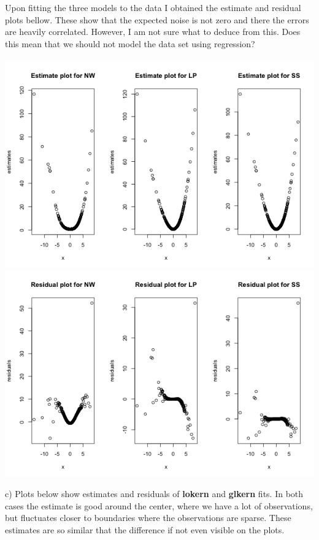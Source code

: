 \documentclass[a4paper,12pt]{article}
\begin{document}
Upon fitting the three models to the data I obtained the estimate and residual plots bellow. These show that the expected noise is not zero and there the errors are heavily correlated. However, I am not sure what to deduce from this. Does this mean that we should not model the data set using regression?
\\
\\

\includegraphics[scale = 0.7]{hmw4_plot21.png}
\includegraphics[scale = 0.7]{hmw4_plot2.png}

c) Plots below show estimates and residuals of \textbf{lokern} and \textbf{glkern} fits. In both cases the estimate is good around the center, where we have a lot of observations, but fluctuates closer to boundaries where the observations are sparse. These estimates are so similar that the difference if not even visible on the plots.
\end{document}
